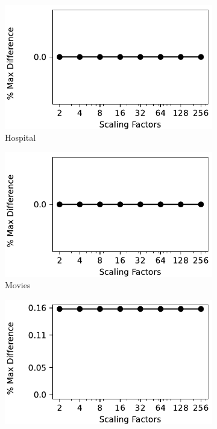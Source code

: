 \begin{figure}[!ht]
\begin{subfigure}{0.32\textwidth}
    \includegraphics[width=\textwidth]{figures/plot/max/max_diff_hospital.pdf}
    \caption{Hospital}
    \label{fig:max_hospitals}
\end{subfigure}
\hfill
\begin{subfigure}{0.32\textwidth}
    \includegraphics[width=\textwidth]{figures/plot/max/max_diff_movies.pdf}
    \caption{Movies}
    \label{exp:max_movies}
\end{subfigure}
\hfill
\begin{subfigure}{0.32\textwidth}
    \includegraphics[width=\textwidth]{figures/plot/max/max_diff_rayyan.pdf}

\end{subfigure}
\end{figure}
